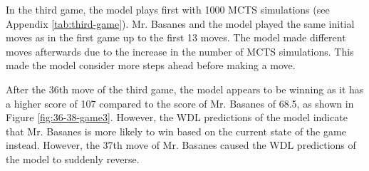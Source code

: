 

In the third game, the model plays first with 1000 MCTS simulations (see Appendix \ref{tab:third-game}). Mr. Basanes and the model played the same initial moves as in the first game up to the first 13 moves. The model made different moves afterwards due to the increase in the number of MCTS simulations. This made the model consider more steps ahead before making a move.

After the 36th move of the third game, the model appears to be winning as it has a higher score of 107 compared to the score of Mr. Basanes of 68.5, as shown in Figure \ref{fig:36-38-game3}. However, the WDL predictions of the model indicate that Mr. Basanes is more likely to win based on the current state of the game instead. However, the 37th move of Mr. Basanes caused the WDL predictions of the model to suddenly reverse.  

